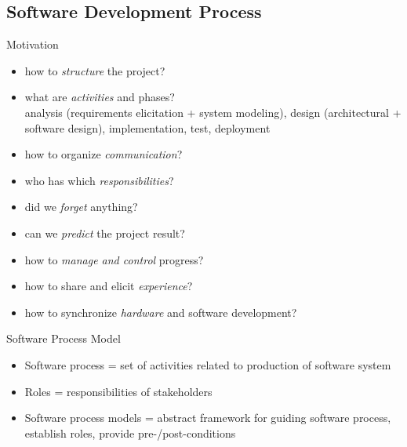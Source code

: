 \subsection{Software Development Process}
\begin{frame}{\insertsubsection}
	\begin{fancycolumns}
		\begin{note}{Motivation}
			\begin{itemize}
				\item how to \emph{structure} the project?
				\item what are \emph{activities} and phases?\\analysis (requirements elicitation + system modeling), design (architectural + software design), implementation, test, deployment
				\item how to organize \emph{communication}?
				\item who has which \emph{responsibilities}?
				\item did we \emph{forget} anything?
				\item can we \emph{predict} the project result?
				\item how to \emph{manage and control} progress?
				\item how to share and elicit \emph{experience}?
				\item how to synchronize \emph{hardware} and software development?
			\end{itemize}
		\end{note}
		\nextcolumn
		\begin{definition}{Software Process Model\mysource{\sommerville}}
			\begin{itemize}
				\item Software process = set of activities related to production of software system
				\item Roles = responsibilities of stakeholders
				\item Software process models = abstract framework for guiding software process, establish roles, provide pre-/post-conditions
			\end{itemize}
		\end{definition}
	\end{fancycolumns}
\end{frame}

